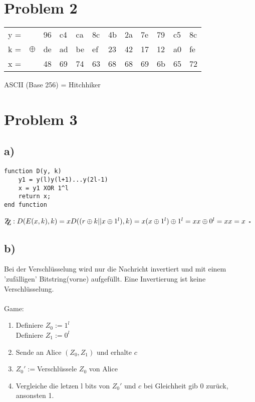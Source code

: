 \documentclass[12pt,pdftex,a4paper]{article}
\begin{document}
\section*{Problem 2}
\begin{table}[!ht]
	\centering
	\begin{tabular}{llllllllllll}
		y = &  & 96 & c4 & ca & 8c & 4b & 2a & 7e & 79 & c5 & 8c \\
		k = & $ \oplus $ & de & ad & be & ef & 23 & 42 & 17 & 12 & a0 & fe \\ \hline
		x = &  & 48 & 69 & 74 & 63 & 68 & 68 & 69 & 6b & 65 & 72
	\end{tabular}
\end{table}
ASCII (Base 256) = Hitchhiker

\section*{Problem 3}
\subsection*{a)}
\begin{lstlisting}
function D(y, k)
	y1 = y(l)y(l+1)...y(2l-1)
	x = y1 XOR 1^l
	return x;
end function
\end{lstlisting}

$ \\
\mathrm{Z\kern-.3em\raise-0.5ex\hbox{Z}}:
D(E(x, k), k) = x\\~\\
D((r \oplus k || x \oplus 1^l), k) = x\\
(x \oplus 1^l) \oplus 1^l = x\\
x \oplus 0^l = x\\
x = x $
$ \square $
\\

\subsection*{b)}
Bei der Verschlüsselung wird nur die Nachricht invertiert und mit einem 'zufälligen' Bitstring(vorne) aufgefüllt. Eine Invertierung ist keine Verschlüsselung.
\\~\\
Game:
\begin{enumerate}
	\item Definiere $ Z_0 := 1^l$\\
		Definiere $ Z_1 := 0^l$
	\item Sende an Alice $ (Z_0, Z_1) $ und erhalte $ c $
	\item  $ Z_0' := $Verschlüssele $ Z_0 $ von Alice
	\item Vergleiche die letzen l bits von $ Z_0' $ und $ c $  bei Gleichheit gib 0 zurück, ansonsten 1.
\end{enumerate}
\end{document}
